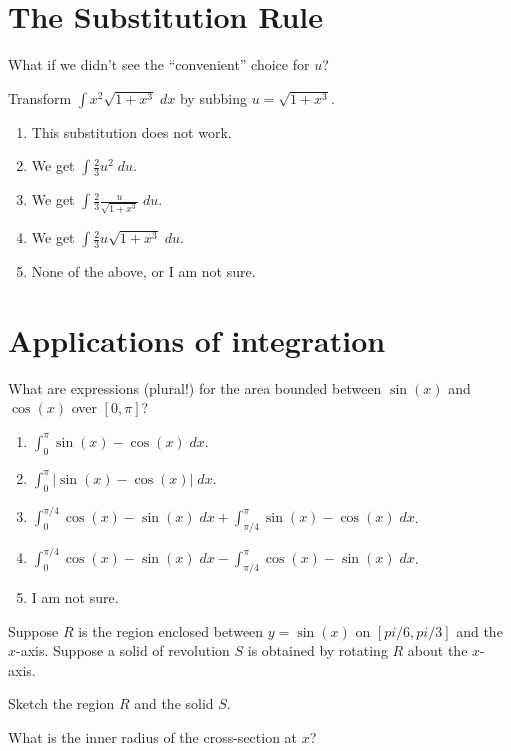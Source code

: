 \documentclass[14pt]{beamer}
\begin{document}
\section{The Substitution Rule}
\begin{frame}[t]
  What if we didn't see the ``convenient'' choice for \(u\)? 

  Transform \(\int x^{2} \sqrt{ 1 + x^{3} } \;dx\) by subbing \(u = \sqrt{ 1 + x^{3} }\).

  \begin{enumerate} \setlength\itemsep{1ex}
    \item This substitution does not work.
    \item We get \(\int \frac{2}{3} u^{2} \;du\). 
    \item We get \(\int \frac{2}{3} \frac{u}{\sqrt{ 1 + x^{3} }} \;du\). 
  \item We get \(\int \frac{2}{3} u \sqrt{1 + x^{3}} \;du\). 
    \item None of the above, or I am not sure.
  \end{enumerate}
\end{frame}

\section{Applications of integration}

\begin{frame}[t]
  What are expressions (plural!) for the area bounded between \(\sin(x)\) and \(\cos(x)\) over \([0, \pi]\)?

  \begin{enumerate} \setlength\itemsep{1ex}
    \item \(\int_{0}^{\pi} \sin(x) - \cos(x) \;dx\).
    \item \(\int_{0}^{\pi} |\sin(x) - \cos(x)| \;dx\).
    \item \(\int_{0}^{\pi/4} \cos(x) - \sin(x) \;dx + \int_{\pi/4}^{\pi} \sin(x) - \cos(x) \;dx\).
    \item \(\int_{0}^{\pi/4} \cos(x) - \sin(x) \;dx - \int_{\pi/4}^{\pi} \cos(x) - \sin(x) \;dx\).
    \item I am not sure. 
  \end{enumerate}
\end{frame}

\begin{frame}[t]
  Suppose \(R\) is the region enclosed between \(y = \sin(x)\) on \([pi/6, pi/3]\) and the \(x\)-axis.  Suppose a solid of revolution \(S\) is obtained by rotating \(R\) about the \(x\)-axis. 

  Sketch the region \(R\) and the solid \(S\).

  What is the inner radius of the cross-section at \(x\)? 
\end{frame}
\end{document}
